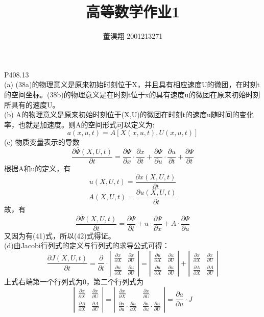 \documentclass[UTF8]{ctexart}
\begin{document}
\title{高等数学作业1}
\author{董淏翔 2001213271}
\maketitle
\newpage
{P408.13}
\\(a) (38a)的物理意义是原来初始时刻位于X，并且具有相应速度U的微团，在时刻t的空间坐标。(38b)的物理意义是在时刻t位于x的具有速度u的微团在原来初始时刻所具有的速度U。
\\(b) A的物理意义是原来初始时刻位于(X,U)的微团在时刻t的速度u随时间的变化率，也就是加速度。则A的空间形式可以定义为:
$$a(x,u,t)=A[X(x,u,t), U(x,u,t)]$$
(c) 物质变量表示的导数
$$\frac{\partial\overline\Psi(X,U,t)}{\partial t} = \frac{\partial\Psi}{\partial x}\cdot\frac{\partial x}{\partial t} + \frac{\partial\Psi}{\partial u}\cdot\frac{\partial u}{\partial t} + \frac{\partial\Psi}{\partial t}$$
根据A和u的定义，有
$$u(X,U,t) = \frac{\partial x(X,U,t)}{\partial t}$$
$$A(X,U,t) = \frac{\partial u(X,U,t)}{\partial t}$$
故，有
$$\frac{\partial\overline\Psi(X,U,t)}{\partial t} =
\frac{\partial\Psi}{\partial t} + u\cdot\frac{\partial\Psi}{\partial x} + A\cdot\frac{\partial\Psi}{\partial u}$$
又因为有(41)式，所以(42)式得证。
\\(d)由Jacobi行列式的定义与行列式的求导公式可得：
$$\frac{\partial J(X,U,t)}{\partial t} =\frac{\partial}{\partial t}\cdot
{\left|
	\begin{array}{ccc}
    	\frac{\partial x}{\partial X} & \frac{\partial x}{\partial U}\\
    	\frac{\partial u}{\partial X} & \frac{\partial u}{\partial U}
	\end{array} 	
\right |} = 
{\left|
	\begin{array}{ccc}
		\frac{\partial u}{\partial X} & \frac{\partial u}{\partial U}\\
		\frac{\partial u}{\partial X} & \frac{\partial u}{\partial U}
	\end{array} 	
\right |} + 
{\left|
	\begin{array}{ccc}
		\frac{\partial x}{\partial X} & \frac{\partial x}{\partial U}\\
		\frac{\partial A}{\partial X} & \frac{\partial A}{\partial U}
	\end{array} 	
	\right |}
$$
上式右端第一个行列式为0，第二个行列式为
$$
{\left|
	\begin{array}{ccc}
		\frac{\partial x}{\partial X} & \frac{\partial x}{\partial U}\\
		\frac{\partial A}{\partial X} & \frac{\partial A}{\partial U}
	\end{array} 	
	\right |} = 
{\left|
	\begin{array}{ccc}
		\frac{\partial x}{\partial X} & \frac{\partial x}{\partial U}\\
		\frac{\partial a}{\partial u}\cdot\frac{\partial u}{\partial X} & \frac{\partial a}{\partial u}\cdot\frac{\partial u}{\partial U}
	\end{array} 	
	\right |} = 
\frac{\partial a}{\partial u}\cdot J
$$
\end{document}
